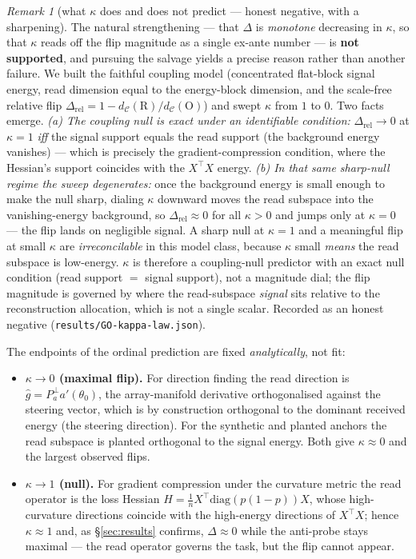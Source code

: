 \documentclass[10pt]{article} %
\theoremstyle{remark}
\newtheorem*{remark}{Remark}
\newcommand{\kalign}{\kappa}
\begin{document}
\begin{remark}[what $\kalign$ does and does not predict --- honest negative, with a sharpening]\label{rem:kappa}
The natural strengthening --- that $\Delta$ is \emph{monotone} decreasing in $\kalign$, so
that $\kalign$ reads off the flip magnitude as a single ex-ante number --- is \textbf{not
supported}, and pursuing the salvage yields a precise reason rather than another failure.
We built the faithful coupling model (concentrated flat-block signal energy, read
dimension equal to the energy-block dimension, and the scale-free relative flip
$\Delta_{\mathrm{rel}}=1-d_{\mathcal C}(\mathrm R)/d_{\mathcal C}(\mathrm O)$) and swept
$\kalign$ from $1$ to $0$. Two facts emerge. \emph{(a) The coupling null is exact under an
identifiable condition:} $\Delta_{\mathrm{rel}}\to0$ at $\kalign=1$ \emph{iff} the signal
support equals the read support (the background energy vanishes) --- which is precisely the
gradient-compression condition, where the Hessian's support coincides with the $X^\top X$
energy. \emph{(b) In that same sharp-null regime the sweep degenerates:} once the
background energy is small enough to make the null sharp, dialing $\kalign$ downward moves
the read subspace into the vanishing-energy background, so $\Delta_{\mathrm{rel}}\approx0$
for all $\kalign>0$ and jumps only at $\kalign=0$ --- the flip lands on negligible signal.
A sharp null at $\kalign=1$ and a meaningful flip at small $\kalign$ are
\emph{irreconcilable} in this model class, because $\kalign$ small \emph{means} the read
subspace is low-energy. $\kalign$ is therefore a coupling-null predictor with an exact null
condition (read support $=$ signal support), not a magnitude dial; the flip magnitude is
governed by where the read-subspace \emph{signal} sits relative to the reconstruction
allocation, which is not a single scalar. Recorded as an honest negative
(\texttt{results/GO-kappa-law.json}).
\end{remark}

\noindent The endpoints of the ordinal prediction are fixed \emph{analytically}, not fit:
\begin{itemize}\itemsep2pt
\item \textbf{$\kalign\to0$ (maximal flip).} For direction finding the read direction is
$\hat g = P_a^{\perp}a'(\theta_0)$, the array-manifold derivative orthogonalised against
the steering vector, which is by construction orthogonal to the dominant received energy
(the steering direction). For the synthetic and planted anchors the read subspace is
planted orthogonal to the signal energy. Both give $\kalign\approx0$ and the largest
observed flips.
\item \textbf{$\kalign\to1$ (null).} For gradient compression under the curvature metric
the read operator is the loss Hessian $H=\tfrac1n X^\top \mathrm{diag}(p(1{-}p))X$, whose
high-curvature directions coincide with the high-energy directions of $X^\top X$; hence
$\kalign\approx1$ and, as \S\ref{sec:results} confirms, $\Delta\approx0$ while the
anti-probe stays maximal --- the read operator governs the task, but the flip cannot
appear.
\end{itemize}
\end{document}
